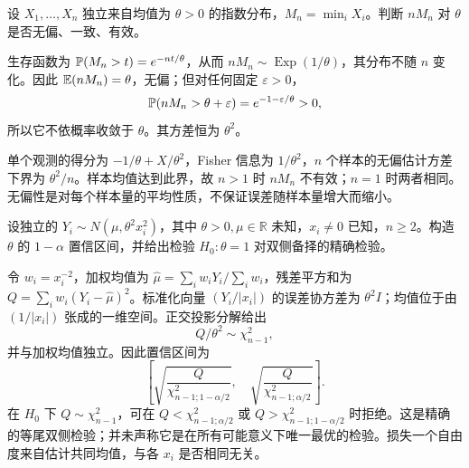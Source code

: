 \begin{example}[原题4：指数样本最小值的估计性质]\label{yau:2015-4}
设 $X_1,\ldots,X_n$ 独立来自均值为 $\theta>0$ 的指数分布，$M_n=\min_iX_i$。判断 $nM_n$ 对 $\theta$ 是否无偏、一致、有效。
\end{example}
\begin{solve}
生存函数为 $\mathbb P(M_n>t)=e^{-nt/\theta}$，从而 $nM_n\sim\operatorname{Exp}(1/\theta)$，其分布不随 $n$ 变化。因此 $\mathbb E(nM_n)=\theta$，无偏；但对任何固定 $\varepsilon>0$，
\[
\mathbb P(nM_n>\theta+\varepsilon)=e^{-1-\varepsilon/\theta}>0,
\]
所以它不依概率收敛于 $\theta$。其方差恒为 $\theta^2$。

单个观测的得分为 $-1/\theta+X/\theta^2$，Fisher 信息为 $1/\theta^2$，$n$ 个样本的无偏估计方差下界为 $\theta^2/n$。样本均值达到此界，故 $n>1$ 时 $nM_n$ 不有效；$n=1$ 时两者相同。无偏性是对每个样本量的平均性质，不保证误差随样本量增大而缩小。
\end{solve}

\begin{example}[原题5：已知相对方差的正态模型]\label{yau:2015-5}
设独立的 $Y_i\sim N(\mu,\theta^2x_i^2)$，其中 $\theta>0,\mu\in\mathbb R$ 未知，$x_i\ne0$ 已知，$n\ge2$。构造 $\theta$ 的 $1-\alpha$ 置信区间，并给出检验 $H_0:\theta=1$ 对双侧备择的精确检验。
\end{example}
\begin{solve}
令 $w_i=x_i^{-2}$，加权均值为 $\widehat\mu=\sum_iw_iY_i/\sum_iw_i$，残差平方和为 $Q=\sum_iw_i(Y_i-\widehat\mu)^2$。标准化向量 $(Y_i/|x_i|)$ 的误差协方差为 $\theta^2I$；均值位于由 $(1/|x_i|)$ 张成的一维空间。正交投影分解给出
\[
Q/\theta^2\sim\chi^2_{n-1},
\]
并与加权均值独立。因此置信区间为
\[
\left[\sqrt{\frac Q{\chi^2_{n-1;1-\alpha/2}}},\quad
\sqrt{\frac Q{\chi^2_{n-1;\alpha/2}}}\right].
\]
在 $H_0$ 下 $Q\sim\chi^2_{n-1}$，可在 $Q<\chi^2_{n-1;\alpha/2}$ 或 $Q>\chi^2_{n-1;1-\alpha/2}$ 时拒绝。这是精确的等尾双侧检验；并未声称它是在所有可能意义下唯一最优的检验。损失一个自由度来自估计共同均值，与各 $x_i$ 是否相同无关。
\end{solve}

